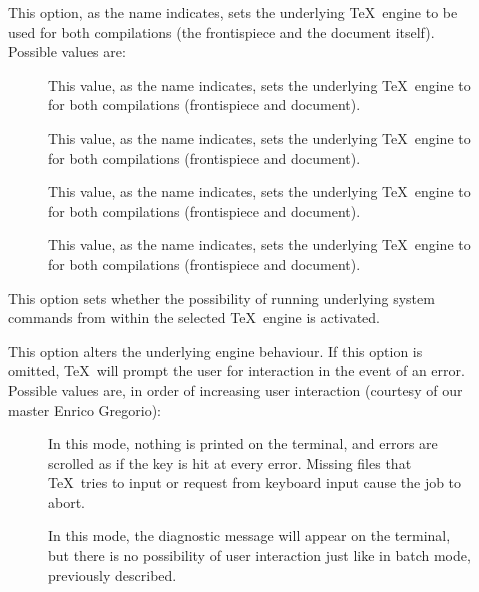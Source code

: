 \begin{description}
\begin{description}
\item[] This option, as the name indicates, sets the underlying \TeX\ engine to be used for both compilations (the frontispiece and the document itself). Possible values are:

\begin{description}
\item[] This value, as the name indicates, sets the underlying \TeX\ engine to  for both compilations (frontispiece and document).

\item[] This value, as the name indicates, sets the underlying \TeX\ engine to  for both compilations (frontispiece and document).

\item[] This value, as the name indicates, sets the underlying \TeX\ engine to  for both compilations (frontispiece and document).

\item[] This value, as the name indicates, sets the underlying \TeX\ engine to  for both compilations (frontispiece and document).
\end{description}

\item[] This option sets whether the possibility of running underlying system commands from within the selected \TeX\ engine is activated.

\item[] This option alters the underlying engine behaviour. If this option is omitted, \TeX\ will prompt the user for interaction in the event of an error. Possible values are, in order of increasing user interaction (courtesy of our master Enrico Gregorio):

\begin{description}
\item[] In this mode, nothing is printed on the terminal, and errors are scrolled as if the  key is hit at every error. Missing files that \TeX\ tries to input or request from keyboard input cause the job to abort.

\item[] In this mode, the diagnostic message will appear on the terminal, but there is no possibility of user interaction just like in batch mode, previously described.


\end{description}
\end{description}
\end{description}
